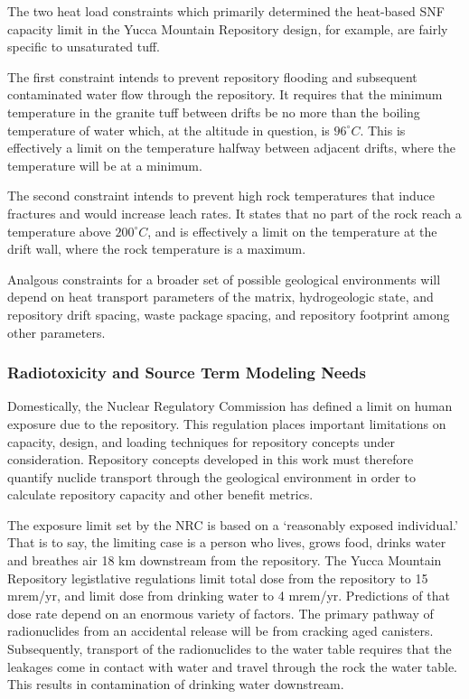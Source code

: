 The two heat load constraints which primarily determined the 
heat-based SNF capacity limit in the Yucca Mountain Repository design, 
for example, are fairly specific to unsaturated tuff. 

The first constraint intends to prevent repository flooding and 
subsequent contaminated water flow through the repository. It requires 
that the minimum temperature in the granite tuff between drifts be no 
more than the boiling temperature of water which, at the altitude in 
question, is $96^{\circ}C$. This is effectively a limit on the 
temperature halfway between adjacent drifts, where the temperature 
will be at a minimum.

The second constraint intends to prevent high rock temperatures that 
induce fractures and would increase leach rates. It states that no 
part of the rock reach a temperature above $200^{\circ}C$, and is 
effectively a limit on the temperature at the drift wall, where the 
rock temperature is a maximum.  

Analgous constraints for a broader set of possible geological 
environments will depend on heat transport parameters of the matrix, 
hydrogeologic state, and repository drift spacing, waste package 
spacing, and repository footprint among other parameters. 

\subsubsection{Radiotoxicity and Source Term Modeling Needs}

Domestically, the Nuclear Regulatory Commission has defined a limit on  
human exposure due to the repository. This regulation places important 
limitations on capacity, design, and loading techniques for repository 
concepts under consideration. Repository concepts developed in this 
work must therefore quantify nuclide transport through the geological 
environment in order to calculate repository capacity and other 
benefit metrics. 

The exposure limit set by the NRC is based on a `reasonably exposed 
individual.' That is to say, the limiting case is a person who lives, 
grows food, drinks water and breathes air 18 km downstream from the 
repository. The Yucca Mountain Repository legistlative regulations 
limit total dose from the repository to 15 mrem/yr, and limit dose 
from drinking water to 4 mrem/yr.  Predictions of that dose rate 
depend on an enormous variety of factors. The primary pathway of 
radionuclides from an accidental release will be from cracking aged 
canisters. Subsequently, transport of the radionuclides to the water 
table requires that the leakages come in contact with water and travel 
through the rock the water table. This results in contamination of 
drinking water downstream.  

